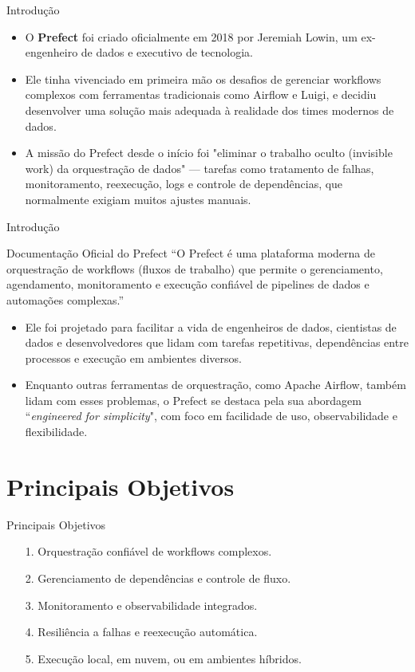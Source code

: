 \documentclass[t,serif]{beamer}
\begin{document}
	\begin{frame}{Introdução}
		\begin{itemize}
			\item O \textbf{Prefect} foi criado oficialmente em 2018 por Jeremiah Lowin, um ex-engenheiro de dados e executivo de tecnologia.
			\vspace{0.5cm}
			\item Ele tinha vivenciado em primeira mão os desafios de gerenciar workflows complexos com ferramentas tradicionais como Airflow e Luigi, e decidiu desenvolver uma solução mais adequada à realidade dos times modernos de dados.
			\vspace{0.5cm}
			\item A missão do Prefect desde o início foi "eliminar o trabalho oculto (invisible work) da orquestração de dados" — tarefas como tratamento de falhas, monitoramento, reexecução, logs e controle de dependências, que normalmente exigiam muitos ajustes manuais.
		\end{itemize}
	\end{frame}
	
	\begin{frame}{Introdução}
		\begin{block}{Documentação Oficial do Prefect}
			``O Prefect é uma plataforma moderna de orquestração de workflows (fluxos de trabalho) que permite o gerenciamento, agendamento, monitoramento e execução confiável de pipelines de dados e automações complexas.''
		\end{block}
		\begin{itemize}
			\item Ele foi projetado para facilitar a vida de engenheiros de dados, cientistas de dados e desenvolvedores que lidam com tarefas repetitivas, dependências entre processos e execução em ambientes diversos.
			\item Enquanto outras ferramentas de orquestração, como Apache Airflow, também lidam com esses problemas, o Prefect se destaca pela sua abordagem ``\textit{engineered for simplicity}", com foco em facilidade de uso, observabilidade e flexibilidade.
		\end{itemize}
	\end{frame}
	
\section{Principais Objetivos}
	\begin{frame}{Principais Objetivos}
		\begin{enumerate}
			\item[1.] Orquestração confiável de workflows complexos.
			\item[2.] Gerenciamento de dependências e controle de fluxo.
			\item[3.] Monitoramento e observabilidade integrados.
			\item[4.] Resiliência a falhas e reexecução automática.
			\item[5.] Execução local, em nuvem, ou em ambientes híbridos.
		\end{enumerate}
	\end{frame}
	
\end{document}
